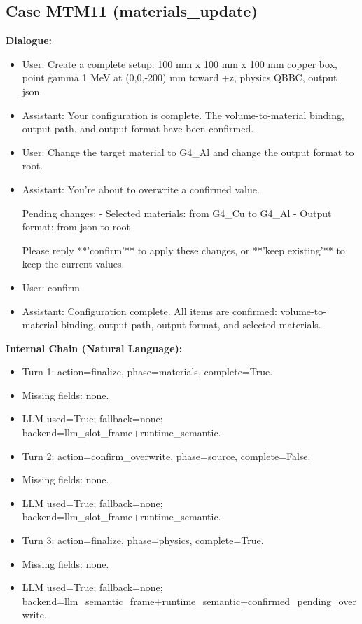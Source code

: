 \documentclass[11pt]{ctexart}
\begin{document}
\subsection{Case MTM11 (materials\_update)}
\textbf{Dialogue:}
\begin{itemize}
\item User: Create a complete setup: 100 mm x 100 mm x 100 mm copper box, point gamma 1 MeV at (0,0,-200) mm toward +z, physics QBBC, output json.
\item Assistant: Your configuration is complete. The volume-to-material binding, output path, and output format have been confirmed.
\item User: Change the target material to G4\_Al and change the output format to root.
\item Assistant: You're about to overwrite a confirmed value.

Pending changes:
- Selected materials: from G4\_Cu to G4\_Al
- Output format: from json to root

Please reply **'confirm'** to apply these changes, or **'keep existing'** to keep the current values.
\item User: confirm
\item Assistant: Configuration complete. All items are confirmed: volume-to-material binding, output path, output format, and selected materials.
\end{itemize}
\textbf{Internal Chain (Natural Language):}
\begin{itemize}
\item Turn 1: action=finalize, phase=materials, complete=True.
\item Missing fields: none.
\item LLM used=True; fallback=none; backend=llm\_slot\_frame+runtime\_semantic.
\item Turn 2: action=confirm\_overwrite, phase=source, complete=False.
\item Missing fields: none.
\item LLM used=True; fallback=none; backend=llm\_slot\_frame+runtime\_semantic.
\item Turn 3: action=finalize, phase=physics, complete=True.
\item Missing fields: none.
\item LLM used=True; fallback=none; backend=llm\_semantic\_frame+runtime\_semantic+confirmed\_pending\_overwrite.
\end{itemize}
\end{document}
